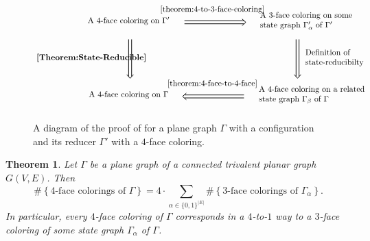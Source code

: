 \documentclass[12pt]{amsart}
\newtheorem{theorem}{Theorem}[section]
\theoremstyle{definition}
\theoremstyle{remark}
\numberwithin{equation}{section}
\begin{document}
\begin{figure}[h]
$$\begin{tikzpicture}[thick, scale = .8]
\draw (0,0) node {A $4$-face coloring on $\Gamma'$};
\draw (3,0) -- (6.2,0);
\draw (3,-0.16) -- (6.2,-0.16);
\draw (6.1,0.1)--(6.3,-0.08)--(6.1,-0.26);
\draw (4.5,.6) node {\Cref{theorem:4-to-3-face-coloring}};             
\node[text width = 4.7 cm] at (10,0) {A $3$-face coloring on some \\ state graph $\Gamma_{\alpha}'$ of $\Gamma'$};
\begin{scope}[yshift = -4cm]
\draw (0,0) node {A $4$-face coloring on $\Gamma$};
\begin{scope}[xscale=-1,xshift=-9.2cm]
\draw (3,0) -- (6.2,0);
\draw (3,-0.16) -- (6.2,-0.16);
\draw (6.1,0.1)--(6.3,-0.08)--(6.1,-0.26);
\end{scope}
\draw (4.5,.6) node {\Cref{theorem:4-face-to-4-face}};             
\node[text width = 4.8 cm] at (10,0) {A $4$-face coloring on a related state graph $\Gamma_{\beta}$ of $\Gamma$};
\end{scope}
\draw (0,-1) -- (0,-3);
\draw (0.16,-1) -- (0.16,-3);
\draw (-0.1,-2.9)--(0.08,-3.1)--(0.26,-2.9);
\draw (-2,-2) node {\bf \Cref{Theorem:State-Reducible}};  
\begin{scope}[xshift = 9cm]
\draw (0,-1) -- (0,-3);
\draw (0.16,-1) -- (0.16,-3);
\draw (-0.1,-2.9)--(0.08,-3.1)--(0.26,-2.9);
\draw (2,-2) node {\hspace{.6cm}\parbox[m]{3cm}{Definition of\\state-reducibilty}};  
\end{scope}
\end{tikzpicture}$$
\caption{A diagram of the proof of  for a plane graph $\Gamma$ with a configuration and its reducer $\Gamma'$ with a $4$-face coloring.}
\label{fig:TheoremAProofPlan}
\end{figure}

\begin{theorem}\label{theorem:4-to-3-face-coloring}
Let $\Gamma$ be a plane graph of a connected trivalent planar graph $G(V,E)$.  Then
$$ \#\left\{\mbox{$4$-face colorings of $\Gamma$}\right\} = 4\cdot \sum_{\alpha\in\{0,1\}^{|E|}} \# \left\{\mbox{$3$-face colorings of $\Gamma_\alpha$}\right\}.$$
In particular, every $4$-face coloring of $\Gamma$ corresponds in a $4$-to-$1$ way to a $3$-face coloring of some state graph $\Gamma_\alpha$ of $\Gamma$.
\end{theorem}
\end{document}
